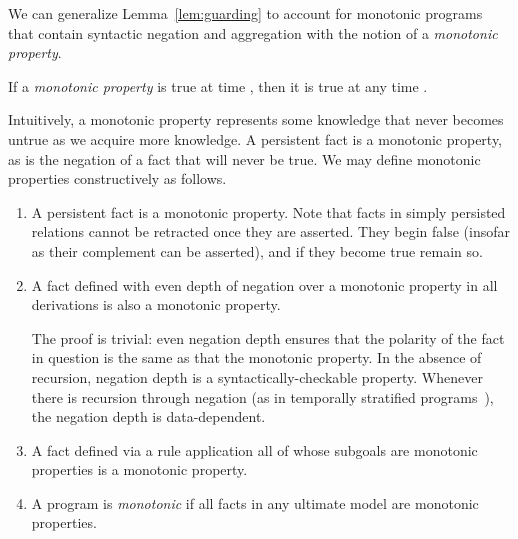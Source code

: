 We can generalize Lemma~\ref{lem:guarding} to account for monotonic programs that 
contain syntactic negation and aggregation with
the notion of a {\em monotonic property}.




\begin{definition}
If a {\em monotonic property} is true at time , then it is true at any time .
\end{definition}

Intuitively, a monotonic property represents some knowledge that never becomes untrue as we acquire  more knowledge.  A persistent fact is a monotonic property, as is the negation of a
fact that will never be true.  We may define monotonic properties constructively as follows.


\begin{enumerate}
\item A persistent fact is a monotonic property.   
Note that facts in simply persisted relations cannot be retracted once they are asserted.  They begin false
(insofar as their complement can be asserted), and if they become true remain so.


\item A fact defined with even depth of negation over a monotonic property in all derivations is also a monotonic property.

The proof is trivial: even negation depth ensures that the polarity of the fact in question is the
same as that the monotonic property.  In the absence of recursion, negation depth is a syntactically-checkable property.  Whenever there is recursion through negation
(as in temporally stratified \lang programs~\cite{dedalus}), the negation depth is data-dependent.


\item A fact defined via a rule application all of whose subgoals are monotonic properties is a
monotonic property.  



\item A \lang program is {\em monotonic} if all facts in any ultimate model are monotonic properties.
\end{enumerate}

